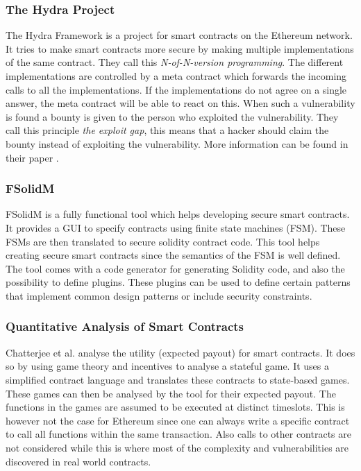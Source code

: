 \documentclass[a4paper]{article}
\begin{document}
\subsubsection{The Hydra Project}
The Hydra Framework is a project for smart contracts on the Ethereum network. It tries to make smart contracts more secure by making multiple implementations of the same contract. They call this \textit{N-of-N-version programming}. The different implementations are controlled by a meta contract which forwards the incoming calls to all the implementations. If the implementations do not agree on a single answer, the meta contract will be able to react on this. When such a vulnerability is found a bounty is given to the person who exploited the vulnerability. They call this principle \textit{the exploit gap}, this means that a hacker should claim the bounty instead of exploiting the vulnerability. More information can be found in their paper \cite{breidenbachenter}. 

\subsubsection{FSolidM}
FSolidM \cite{mavridou2018tool} is a fully functional tool which helps developing secure smart contracts. It provides a GUI to specify contracts using finite state machines (FSM). These FSMs are then translated to secure solidity contract code. This tool helps creating secure smart contracts since the semantics of the FSM is well defined. The tool comes with a code generator for generating Solidity code, and also the possibility to define plugins. These plugins can be used to define certain patterns that implement common design patterns or include security constraints. 
\subsubsection{Quantitative Analysis of Smart Contracts}
Chatterjee et al. \cite{chatterjee2018quantitative} analyse the utility (expected payout) for smart contracts. It does so by using game theory and incentives to analyse a stateful game. It uses a simplified contract language and translates these contracts to state-based games. These games can then be analysed by the tool for their expected payout. The functions in the games are assumed to be executed at distinct timeslots. This is however not the case for Ethereum since one can always write a specific contract to call all functions within the same transaction. Also calls to other contracts are not considered while this is where most of the complexity and vulnerabilities are discovered in real world contracts.
\end{document}
